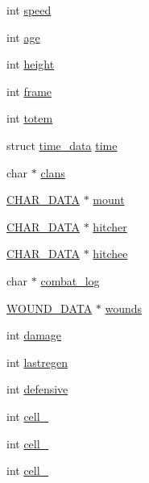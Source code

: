 \begin{DoxyCompactItemize}
int \hyperlink{structchar__data_ac7f93b59cc34806a603bed866dc3b640}{speed}
\item 
int \hyperlink{structchar__data_a86b48ce2360461ba54f49a026382cbdd}{age}
\item 
int \hyperlink{structchar__data_a4d5565b26fa35003753a84dd290b0328}{height}
\item 
int \hyperlink{structchar__data_a09f8da916a21777fad1b3e4483d3b8f1}{frame}
\item 
int \hyperlink{structchar__data_ad6c41a12b95d14e095609db917cdd2e5}{totem}
\item 
struct \hyperlink{structtime__data}{time\-\_\-data} \hyperlink{structchar__data_a46ac9e3eca5a190d6e0ea6dc97c914eb}{time}
\item 
char $\ast$ \hyperlink{structchar__data_ab6a4062f8bfdacb5aea94236760062e3}{clans}
\item 
\hyperlink{structs_8h_af33ed1e66e8541a08bed257124f50f31}{C\-H\-A\-R\-\_\-\-D\-A\-T\-A} $\ast$ \hyperlink{structchar__data_a1733f7ab0ea5bf73cdeb264340456e33}{mount}
\item 
\hyperlink{structs_8h_af33ed1e66e8541a08bed257124f50f31}{C\-H\-A\-R\-\_\-\-D\-A\-T\-A} $\ast$ \hyperlink{structchar__data_a2f4887f4290264ffedaacdbf0e5888a1}{hitcher}
\item 
\hyperlink{structs_8h_af33ed1e66e8541a08bed257124f50f31}{C\-H\-A\-R\-\_\-\-D\-A\-T\-A} $\ast$ \hyperlink{structchar__data_a27ffd073a0209399dbe751b676f3d706}{hitchee}
\item 
char $\ast$ \hyperlink{structchar__data_a170221ae1f9b1a525fab238c447fd3c4}{combat\-\_\-log}
\item 
\hyperlink{structs_8h_acd99076446b10c8cfc2d23d4bfc40211}{W\-O\-U\-N\-D\-\_\-\-D\-A\-T\-A} $\ast$ \hyperlink{structchar__data_a7c4ecc2b53934e497083f7b634e711b1}{wounds}
\item 
int \hyperlink{structchar__data_ae29b20ac400dd03cb5fd05018070dd36}{damage}
\item 
int \hyperlink{structchar__data_a12b288d711e71eb25df1f89552d8c286}{lastregen}
\item 
int \hyperlink{structchar__data_a9df13a4b83c85a904757bab0959b9193}{defensive}
\item 
int \hyperlink{structchar__data_a9589fd6b9834014089c1a1546a849d27}{cell\-\_}
\item 
int \hyperlink{structchar__data_a1f06eaf60b03fca81ec2b833feac14fb}{cell\-\_}
\item 
int \hyperlink{structchar__data_a05c31611b5a718e646b2e04d895006f2}{cell\-\_}
\item 

\end{DoxyCompactItemize}
